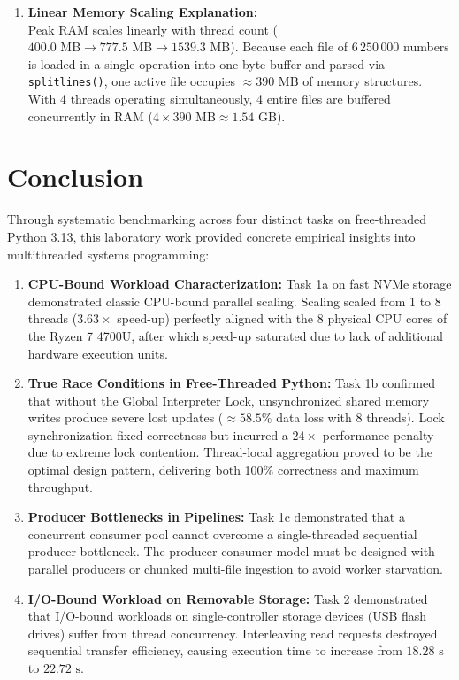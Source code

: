 \documentclass{labreport}
\begin{document}
\begin{enumerate}
    \item \textbf{Linear Memory Scaling Explanation:}\\
    Peak RAM scales linearly with thread count ($400.0\text{ MB} \to 777.5\text{ MB} \to 1539.3\text{ MB}$). Because each file of $6\,250\,000$ numbers is loaded in a single operation into one byte buffer and parsed via \texttt{splitlines()}, one active file occupies $\approx 390\text{ MB}$ of memory structures. With 4 threads operating simultaneously, 4 entire files are buffered concurrently in RAM ($4 \times 390\text{ MB} \approx 1.54\text{ GB}$).
\end{enumerate}

\newpage

\section{Conclusion}

Through systematic benchmarking across four distinct tasks on free-threaded Python 3.13, this laboratory work provided concrete empirical insights into multithreaded systems programming:
\begin{enumerate}
    \item \textbf{CPU-Bound Workload Characterization:} Task 1a on fast NVMe storage demonstrated classic CPU-bound parallel scaling. Scaling scaled from 1 to 8 threads ($3.63\times$ speed-up) perfectly aligned with the 8 physical CPU cores of the Ryzen 7 4700U, after which speed-up saturated due to lack of additional hardware execution units.
    \item \textbf{True Race Conditions in Free-Threaded Python:} Task 1b confirmed that without the Global Interpreter Lock, unsynchronized shared memory writes produce severe lost updates ($\approx 58.5\%$ data loss with 8 threads). Lock synchronization fixed correctness but incurred a $24\times$ performance penalty due to extreme lock contention. Thread-local aggregation proved to be the optimal design pattern, delivering both 100\% correctness and maximum throughput.
    \item \textbf{Producer Bottlenecks in Pipelines:} Task 1c demonstrated that a concurrent consumer pool cannot overcome a single-threaded sequential producer bottleneck. The producer-consumer model must be designed with parallel producers or chunked multi-file ingestion to avoid worker starvation.
    \item \textbf{I/O-Bound Workload on Removable Storage:} Task 2 demonstrated that I/O-bound workloads on single-controller storage devices (USB flash drives) suffer from thread concurrency. Interleaving read requests destroyed sequential transfer efficiency, causing execution time to increase from $18.28\text{ s}$ to $22.72\text{ s}$.
\end{enumerate}
\end{document}

